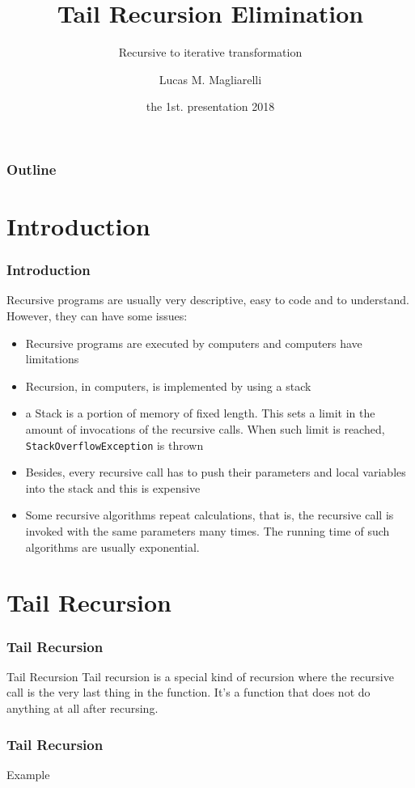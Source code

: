 \documentclass{beamer}
\title[Tail Recursion Elimination]{Tail Recursion Elimination}
\subtitle{Recursive to iterative transformation}
\author[Lucas M. Magliarelli]{
	Lucas M. Magliarelli 
}
\institute[TradeHelm Inc.]{
	TradeHelm Inc.
}
\date[March, 2018]{
	the 1st. presentation 2018
}
\begin{document}
\begin{frame}
	\titlepage
\end{frame}
\begin{frame}
	\frametitle{Outline}
	\tableofcontents
\end{frame}
\section{Introduction}
\begin{frame}
	\frametitle{Introduction}
	Recursive programs are usually very descriptive, easy to code and to understand. However, they can have some issues:
	\begin{itemize}
		\item Recursive programs are executed by computers and computers have limitations
		\item Recursion, in computers, is implemented by using a stack
		\item a Stack is a portion of memory of fixed length. This sets a limit in the amount of invocations of the recursive calls. When such limit is reached, \texttt{StackOverflowException} is thrown
		\item Besides, every recursive call has to push their parameters and local variables into the stack and this is expensive
		\item Some recursive algorithms repeat calculations, that is, the recursive call is invoked with the same parameters many times. The running time of such algorithms are usually exponential. 
	\end{itemize}
\end{frame}
\section{Tail Recursion}
\begin{frame}
	\frametitle{Tail Recursion}
	\begin{block}{Tail Recursion}
		Tail recursion is a special kind of recursion where the recursive call is the very last thing in the function. It's a function that does not do anything at all after recursing.
		\begin{center}
				\begin{algorithmic}[1]
					\State{}
				\Else
					\State{}
				\EndIf
				\EndProcedure
			\end{algorithmic}
		\end{center}
	\end{block}
\end{frame}
\begin{frame}
	\frametitle{Tail Recursion}
	\begin{block}{Example}
				\begin{algorithmic}[1]
					\State{}
				\Else
					\State{}
				\EndIf
				\EndProcedure
			\end{algorithmic}
	\end{block}
\end{frame}
\end{document}
